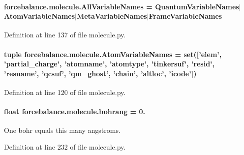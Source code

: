 \hypertarget{namespaceforcebalance_1_1molecule_a8fcfb88fe12a9256b61980f3d4fe3b63}{
\paragraph[{All\-Variable\-Names}]{\setlength{\rightskip}{0pt plus 5cm}forcebalance.\-molecule.\-All\-Variable\-Names = {\bf Quantum\-Variable\-Names}$|${\bf Atom\-Variable\-Names}$|${\bf Meta\-Variable\-Names}$|${\bf Frame\-Variable\-Names}}}\label{namespaceforcebalance_1_1molecule_a8fcfb88fe12a9256b61980f3d4fe3b63}


Definition at line 137 of file molecule.\-py.

\hypertarget{namespaceforcebalance_1_1molecule_a5daa68e835dcb9877d6c3f2fb559b54b}{
\paragraph[{Atom\-Variable\-Names}]{\setlength{\rightskip}{0pt plus 5cm}tuple forcebalance.\-molecule.\-Atom\-Variable\-Names = set(\mbox{[}'elem', 'partial\-\_\-charge', 'atomname', 'atomtype', 'tinkersuf', 'resid', 'resname', 'qcsuf', 'qm\-\_\-ghost', 'chain', 'altloc', 'icode'\mbox{]})}}\label{namespaceforcebalance_1_1molecule_a5daa68e835dcb9877d6c3f2fb559b54b}


Definition at line 120 of file molecule.\-py.

\hypertarget{namespaceforcebalance_1_1molecule_a76af9edfbaaa8999680e32aafe1b1b61}{
\paragraph[{bohrang}]{\setlength{\rightskip}{0pt plus 5cm}float forcebalance.\-molecule.\-bohrang = 0.}}\label{namespaceforcebalance_1_1molecule_a76af9edfbaaa8999680e32aafe1b1b61}


One bohr equals this many angstroms. 



Definition at line 232 of file molecule.\-py.

